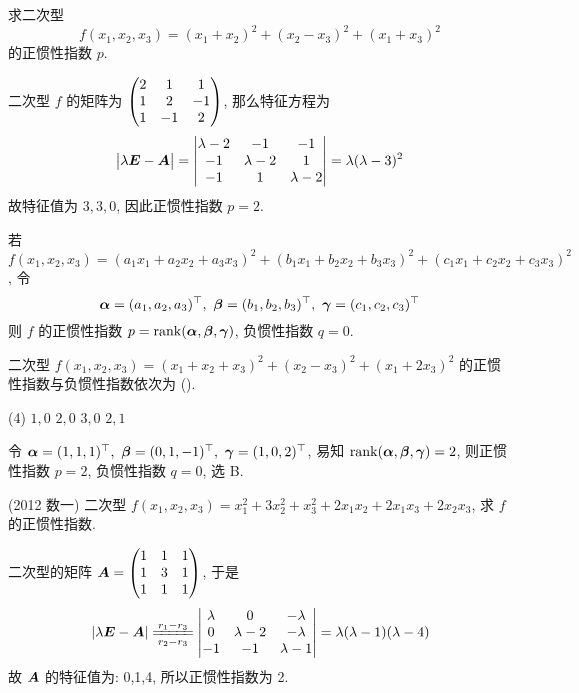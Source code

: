 \begin{example}
    \label{fx1x2x3p}求二次型 $$f(x_1,x_2,x_3)=(x_1+x_2)^2+(x_2-x_3)^2+(x_1+x_3)^2$$ 的正惯性指数 $p.$
\end{example}
\begin{solution}
    二次型 $f$ 的矩阵为 $\mqty(2&1&1\\1&2&-1\\1&-1&2)$, 那么特征方程为 $$\mqty|\lambda\vb*{E}-\vb*{A}|=\mqty|\lambda-2&-1&-1\\-1&\lambda-2&1\\-1&1&\lambda-2|=\lambda(\lambda-3)^2$$
    故特征值为 $3,3,0$, 因此正惯性指数 $p=2.$
\end{solution}

\begin{theorem}
    若 $f(x_1,x_2,x_3)=(a_1x_1+a_2x_2+a_3x_3)^2+(b_1x_1+b_2x_2+b_3x_3)^2+(c_1x_1+c_2x_2+c_3x_3)^2$, 令
    $$\vb*{\alpha}=(a_1,a_2,a_3)^\top,~\vb*{\beta}=(b_1,b_2,b_3)^\top,~\vb*{\gamma}=(c_1,c_2,c_3)^\top$$
    则 $f$ 的正惯性指数 $p=\rank(\vb*{\alpha},\vb*{\beta},\vb*{\gamma})$, 负惯性指数 $q=0.$
\end{theorem}

\begin{example}
    二次型 $f(x_1,x_2,x_3)=(x_1+x_2+x_3)^2+(x_2-x_3)^2+(x_1+2x_3)^2$ 的正惯性指数与负惯性指数依次为 (\quad).
    \begin{tasks}(4)
        \task $1,0$
        \task $2,0$
        \task $3,0$
        \task $2,1$
    \end{tasks}
\end{example}
\begin{solution}
    令 $\vb*{\alpha}=(1,1,1)^\top,~\vb*{\beta}=(0,1,-1)^\top,~\vb*{\gamma}=(1,0,2)^\top$, 易知 $\rank(\vb*{\alpha},\vb*{\beta},\vb*{\gamma})=2$, 则正惯性指数 $p=2$, 负惯性指数 $q=0$, 选 B.
\end{solution}

\begin{example}
    (2012 数一) 二次型 $f(x_1,x_2,x_3)=x_1^2+3x_2^2+x_3^2+2x_1x_2+2x_1x_3+2x_2x_3$, 求 $f$ 的正惯性指数.
\end{example}
\begin{solution}
    二次型的矩阵 $\vb*{A}=\mqty(1&1&1\\1&3&1\\1&1&1)$, 于是
    $$|\lambda\vb*{E}-\vb*{A}|\xlongequal[r_2-r_3]{r_1-r_3}\mqty|\lambda&0&-\lambda\\0&\lambda-2&-\lambda\\-1&-1&\lambda-1|=\lambda(\lambda-1)(\lambda-4)$$
    故 $\vb*{A}$ 的特征值为: 0,1,4, 所以正惯性指数为 2.
\end{solution}

